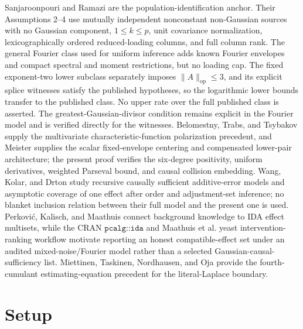 \documentclass{article}
\begin{document}
Sanjaroonpouri and Ramazi are the population-identification anchor. Their Assumptions 2--4 use mutually independent nonconstant non-Gaussian sources with no Gaussian component, \(1\le k\le p\), unit covariance normalization, lexicographically ordered reduced-loading columns, and full column rank. The general Fourier class used for uniform inference adds known Fourier envelopes and compact spectral and moment restrictions, but no loading cap. The fixed exponent-two lower subclass separately imposes \(\|A\|_{\mathrm{op}}\le3\), and its explicit splice witnesses satisfy the published hypotheses, so the logarithmic lower bounds transfer to the published class. No upper rate over the full published class is asserted. The greatest-Gaussian-divisor condition remains explicit in the Fourier model and is verified directly for the witnesses. Belomestny, Trabs, and Tsybakov supply the multivariate characteristic-function polarization precedent, and Meister supplies the scalar fixed-envelope centering and compensated lower-pair architecture; the present proof verifies the six-degree positivity, uniform derivatives, weighted Parseval bound, and causal collision embedding. Wang, Kolar, and Drton study recursive causally sufficient additive-error models and asymptotic coverage of one effect after order and adjustment-set inference; no blanket inclusion relation between their full model and the present one is used. Perkovi\'c, Kalisch, and Maathuis connect background knowledge to IDA effect multisets, while the CRAN \(\texttt{pcalg::ida}\) and Maathuis et al. yeast intervention-ranking workflow motivate reporting an honest compatible-effect set under an audited mixed-noise/Fourier model rather than a selected Gaussian-causal-sufficiency list. Miettinen, Taskinen, Nordhausen, and Oja provide the fourth-cumulant estimating-equation precedent for the literal-Laplace boundary.

\section{Setup}
\end{document}
